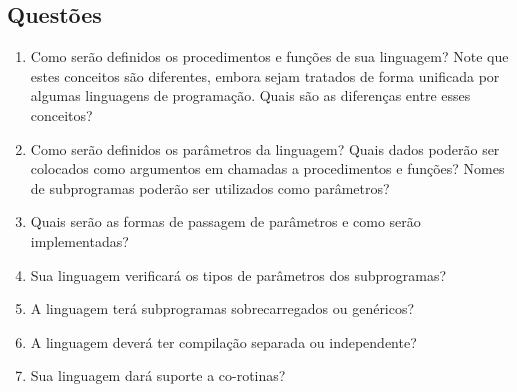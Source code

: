 \documentclass[12pt, a4paper]{article}
\begin{document}
    \subsection{Questões}
    \begin{enumerate}
        \item
        Como serão definidos os procedimentos e funções de sua linguagem?
        Note que estes conceitos são diferentes, embora sejam tratados de
        forma unificada por algumas linguagens de programação. Quais são as
        diferenças entre esses conceitos?

        \item
        Como serão definidos os parâmetros da linguagem? Quais dados
        poderão ser colocados como argumentos em chamadas a procedimentos e
        funções? Nomes de subprogramas poderão ser utilizados como
        parâmetros?

        \item
        Quais serão as formas de passagem de parâmetros e como serão
        implementadas?

        \item
        Sua linguagem verificará os tipos de parâmetros dos subprogramas?

        \item
        A linguagem terá subprogramas sobrecarregados ou genéricos?

        \item
        A linguagem deverá ter compilação separada ou independente?

        \item
        Sua linguagem dará suporte a co-rotinas?
    \end{enumerate}
\end{document}
